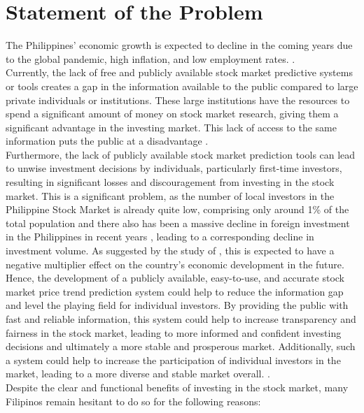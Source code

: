 \section{Statement of the Problem}
\label{sec:problem}
The Philippines' economic growth is expected to decline in the coming 
years due to the global pandemic, high inflation, and low employment rates. 
\cite{Alegado2022,Canto2022,Reuters2022}.
\\Currently, the lack of free and publicly available stock market predictive systems or
 tools creates a gap in the information available to the public compared to large private 
 individuals or institutions. These large institutions have the resources to spend a significant 
 amount of money on stock market research, giving them a significant advantage in the investing 
 market. This lack of access to the same information puts the public at a disadvantage
 \cite{Kim2022}. 
\\ Furthermore, the lack of publicly available stock market prediction tools can 
lead to unwise investment decisions by individuals, particularly first-time investors, 
resulting in significant losses and discouragement from investing in the stock market. 
This is a significant problem, as the number of local investors in the Philippine Stock Market 
is already quite low, comprising only around 1\% of 
the total population and there also has been a massive decline in foreign investment
 in the Philippines in recent years 
 \cite{BusinessWorld2022}, 
 leading to a corresponding decline in investment volume. 
 As suggested by the study of , 
 this is expected to have a negative multiplier effect on the country's 
 economic development in the future. 
\\ Hence, the development of a publicly available, easy-to-use, and
 accurate stock market price trend prediction system could help to 
 reduce the information gap and level the playing field for individual investors. 
 By providing the public with fast and reliable information, this system could help to
  increase transparency and fairness in the stock market, leading to more informed 
  and confident investing decisions and ultimately a more stable and prosperous market.
   Additionally, such a system could help to increase the participation of individual 
   investors in the market, leading to a more diverse and stable market overall.
\cite{Statista2022,POPCOMM2021}.
\\Despite the clear and functional benefits of investing in the stock market, 
many Filipinos remain hesitant to do so for the following reasons:
